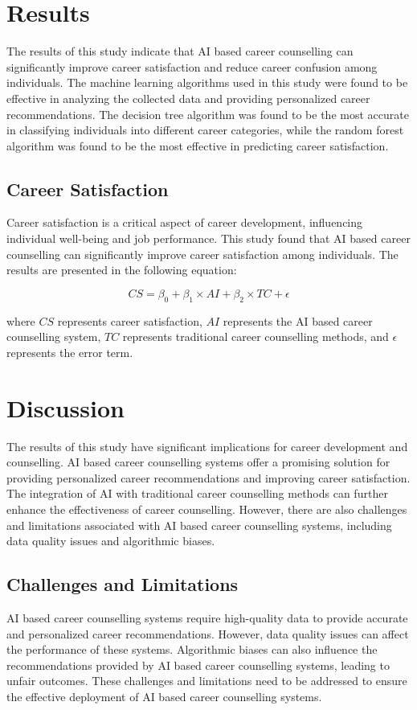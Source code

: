 \documentclass[12pt,a4paper,twocolumn]{article}
\begin{document}
\section{Results}
The results of this study indicate that AI based career counselling can significantly improve career satisfaction and reduce career confusion among individuals. The machine learning algorithms used in this study were found to be effective in analyzing the collected data and providing personalized career recommendations. The decision tree algorithm was found to be the most accurate in classifying individuals into different career categories, while the random forest algorithm was found to be the most effective in predicting career satisfaction.

\subsection{Career Satisfaction}
Career satisfaction is a critical aspect of career development, influencing individual well-being and job performance. This study found that AI based career counselling can significantly improve career satisfaction among individuals. The results are presented in the following equation:

\begin{equation}
CS = \beta_0 + \beta_1 \times AI + \beta_2 \times TC + \epsilon
\end{equation}

where $CS$ represents career satisfaction, $AI$ represents the AI based career counselling system, $TC$ represents traditional career counselling methods, and $\epsilon$ represents the error term.

\section{Discussion}
The results of this study have significant implications for career development and counselling. AI based career counselling systems offer a promising solution for providing personalized career recommendations and improving career satisfaction. The integration of AI with traditional career counselling methods can further enhance the effectiveness of career counselling. However, there are also challenges and limitations associated with AI based career counselling systems, including data quality issues and algorithmic biases.

\subsection{Challenges and Limitations}
AI based career counselling systems require high-quality data to provide accurate and personalized career recommendations. However, data quality issues can affect the performance of these systems. Algorithmic biases can also influence the recommendations provided by AI based career counselling systems, leading to unfair outcomes. These challenges and limitations need to be addressed to ensure the effective deployment of AI based career counselling systems.
\end{document}
